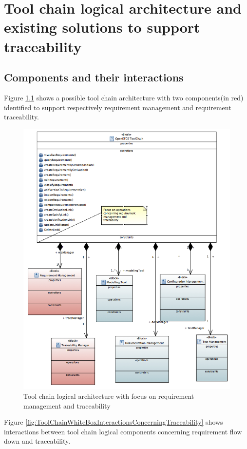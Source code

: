 \documentclass[11pt]{template/openetcs_report}
\begin{document}
\chapter{Tool chain logical architecture and existing solutions to support traceability}
\section{Components and their interactions}

\label{sec-4-1} 

Figure \ref{fig:ToolChainLogicalArchitecture} shows a possible tool chain architecture with two components(in red) identified to support respectively requirement management and requirement traceability.

\begin{figure}[htb]
\centering
\includegraphics[width=.9\linewidth]{images/ToolChainLogicalArchitecture.png}
\caption{\label{fig:ToolChainLogicalArchitecture}Tool chain logical architecture with focus on requirement management and traceability}
\end{figure}

Figure \ref{fig:ToolChainWhiteBoxInteractionsConcerningTraceability} shows interactions between tool chain logical components concerning requirement flow down and traceability.
\end{document}
